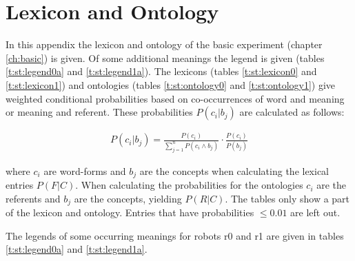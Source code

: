\chapter{Lexicon and Ontology}\label{a:lexicon}

In this appendix the lexicon and ontology of the basic experiment (chapter \ref{ch:basic}) is given. Of some additional meanings the legend is given (tables \ref{t:st:legend0a} and \ref{t:st:legend1a}). The lexicons (tables \ref{t:st:lexicon0} and \ref{t:st:lexicon1}) and ontologies (tables \ref{t:st:ontology0} and \ref{t:st:ontology1}) give  weighted conditional probabilities based on co-occurrences of word and meaning or meaning and referent. These probabilities $P(c_i|b_j)$ are calculated as follows:

\begin{eqnarray}
P(c_i|b_j) = \frac{P(c_i)}{\sum_{j=1}^n P(c_i \wedge b_j)} \cdot \frac{P(c_i)}{P(b_j)}
\end{eqnarray}


where $c_i$ are word-forms and $b_j$ are the concepts when calculating the lexical entries $P(F|C)$. When calculating the probabilities for the ontologies $c_i$ are the referents and $b_j$ are the concepts, yielding $P(R|C)$. The tables only show a part of the lexicon and ontology. Entries that have probabilities $\leq 0.01$ are left out.

The legends of some occurring meanings for robots r0 and r1 are given in tables \ref{t:st:legend0a} and \ref{t:st:legend1a}.


